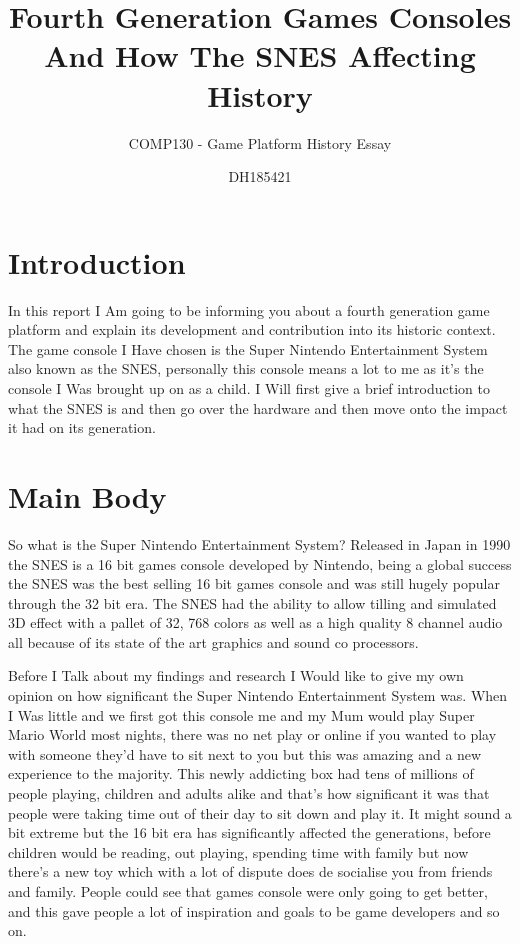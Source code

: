 \documentclass{scrartcl}
\title{Fourth Generation Games Consoles And How The SNES Affecting History}
\subtitle{COMP130 - Game Platform History Essay}
\author{DH185421}
\begin{document}
\maketitle


\section{Introduction}

In this report I Am going to be informing you about a fourth generation game platform and explain its development and contribution into its historic context. The game console I Have chosen is the Super Nintendo Entertainment System also known as the SNES, personally this console means a lot to me as it's the console I Was brought up on as a child. I Will first give a brief introduction to what the SNES is and then go over the hardware and then move onto the impact it had on its generation.
\section{Main Body}

So what is the Super Nintendo Entertainment System? Released in Japan in 1990 the SNES is a 16 bit games console developed by Nintendo, being a global success the SNES was the best selling 16 bit games console and was still hugely popular through the 32 bit era. The 
SNES had the ability to allow tilling and simulated 3D effect with a pallet of 32, 768 colors as well as a high quality 8 channel audio all because of its state of the art graphics and sound co processors.

Before I Talk about my findings and research I Would like to give my own opinion on how significant the Super Nintendo Entertainment System was. When I Was little and we first got this console me and my Mum would play Super Mario World most nights, there was no net play or online if you wanted to play with someone they’d have to sit next to you but this was amazing and a new experience to the majority. This newly addicting box had tens of millions of people playing, children and adults alike and that’s how significant it was that people were taking time out of their day to sit down and play it. It might sound a bit extreme but the 16 bit era has significantly affected the generations, before children would be reading, out playing, spending time with family but now there's a new toy which with a lot of dispute does de socialise you from friends and family. People could see that games console were only going to get better, and this gave people a lot of inspiration and goals to be game developers and so on.
\end{document}
